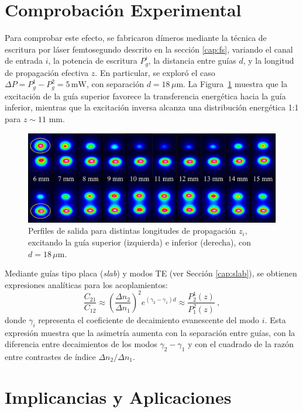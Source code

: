 \section{Comprobación Experimental}
Para comprobar este efecto, se fabricaron dímeros mediante la técnica de escritura por láser femtosegundo descrito en la sección \ref{cap:fs}, variando el canal de entrada \( i \), la potencia de escritura \( P_{g}^i \), la distancia entre guías \( d \), y la longitud de propagación efectiva \( z \). En particular, se exploró el caso \( \Delta P = P_g^1 - P_g^2 = 5\,\mathrm{mW} \), con separación \( d = 18\,\mu\mathrm{m} \). La Figura~\ref{fig:nosymexp} muestra que la excitación de la guía superior favorece la transferencia energética hacia la guía inferior, mientras que la excitación inversa alcanza una distribución energética 1:1 para $z\sim 11$ mm.
\begin{figure}[H]
	\centering
	\includegraphics[width=0.9\linewidth]{media/nonsymm-exp.png}
	\caption[Perfiles de salida para distintas longitudes de propagación.]{Perfiles de salida para distintas longitudes de propagación \( z_i \), excitando la guía superior (izquierda) e inferior (derecha), con \( d = 18\,\mu\mathrm{m} \). \label{fig:nosymexp}}
\end{figure} \vspace{-4ex} Mediante guías tipo placa (\textit{slab}) y modos TE (ver Sección \ref{cap:slab}), se obtienen expresiones analíticas para los acoplamientos:
\begin{equation*}
	\frac{C_{21}}{C_{12}} \approx \left( \frac{\Delta n_2}{\Delta n_1} \right)^2 e^{(\gamma_2 - \gamma_1) d}\approx \frac{P_2^1(z)}{P_1^2(z)} \ ,
\end{equation*}
donde \( \gamma_i \) representa el coeficiente de decaimiento evanescente del modo \( i \). Esta expresión muestra que la asimetría aumenta con la separación entre guías, con la diferencia entre decaimientos de los modos $\gamma_2 - \gamma_1$ y con el cuadrado de la razón entre contrastes de índice $\Delta n_2/\Delta n_1$. 

\section{Implicancias y Aplicaciones}

